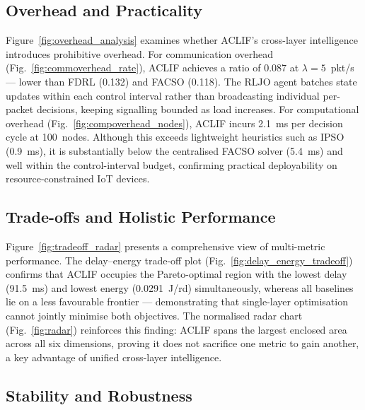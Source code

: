 \documentclass[a4paper]{cas-dc}
\numberwithin{equation}{section}
\begin{document}
\subsection{Overhead and Practicality}
\label{subsec:overhead}

Figure~\ref{fig:overhead_analysis} examines whether ACLIF's cross-layer
intelligence introduces prohibitive overhead. For communication overhead
(Fig.~\ref{fig:commoverhead_rate}), ACLIF achieves a ratio of 0.087 at
$\lambda{=}5$~pkt/s — lower than FDRL (0.132) and FACSO (0.118). The RLJO
agent batches state updates within each control interval rather than
broadcasting individual per-packet decisions, keeping signalling bounded as
load increases. For computational overhead (Fig.~\ref{fig:compoverhead_nodes}),
ACLIF incurs 2.1~ms per decision cycle at 100~nodes. Although this exceeds
lightweight heuristics such as IPSO (0.9~ms), it is substantially below the
centralised FACSO solver (5.4~ms) and well within the control-interval
budget, confirming practical deployability on resource-constrained IoT devices.

\subsection{Trade-offs and Holistic Performance}
\label{subsec:tradeoff}

Figure~\ref{fig:tradeoff_radar} presents a comprehensive view of multi-metric
performance. The delay–energy trade-off plot (Fig.~\ref{fig:delay_energy_tradeoff})
confirms that ACLIF occupies the Pareto-optimal region with the lowest delay
(91.5~ms) and lowest energy (0.0291~J/rd) simultaneously, whereas all
baselines lie on a less favourable frontier — demonstrating that single-layer
optimisation cannot jointly minimise both objectives. The normalised radar
chart (Fig.~\ref{fig:radar}) reinforces this finding: ACLIF spans the largest
enclosed area across all six dimensions, proving it does not sacrifice one
metric to gain another, a key advantage of unified cross-layer intelligence.

\subsection{Stability and Robustness}
\label{subsec:robustness}
\end{document}
